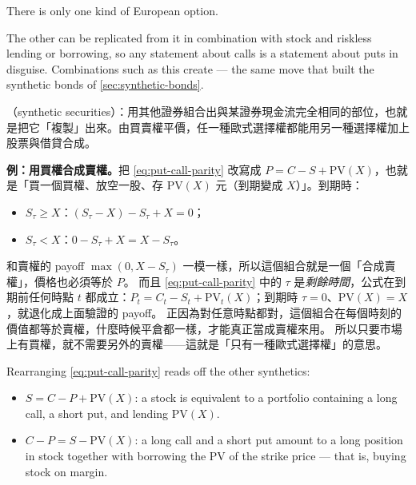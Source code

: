 
\begin{moral}
	There is only one kind of European option.

	The other can be replicated from it in combination with stock and riskless lending or borrowing, so any statement about calls is a statement about puts in disguise.
	Combinations such as this create  --- the same move that built the synthetic bonds of \autoref{sec:synthetic-bonds}.
\end{moral}

\suppstart
\begin{remark}
	（synthetic securities）：用其他證券組合出與某證券現金流完全相同的部位，也就是把它「複製」出來。由買賣權平價，任一種歐式選擇權都能用另一種選擇權加上股票與借貸合成。

	\textbf{例：用買權合成賣權。}把 \eqref{eq:put-call-parity} 改寫成 $P=C-S+\mathrm{PV}(X)$，也就是「買一個買權、放空一股、存 $\mathrm{PV}(X)$ 元（到期變成 $X$）」。到期時：
	\begin{itemize}[nosep]
		\item $S_{\tau}\ge X$：$(S_{\tau}-X)-S_{\tau}+X=0$；
		\item $S_{\tau}<X$：$0-S_{\tau}+X=X-S_{\tau}$。
	\end{itemize}
	和賣權的 payoff $\max(0,X-S_{\tau})$ 一模一樣，所以這個組合就是一個「合成賣權」，價格也必須等於 $P$。
	而且 \eqref{eq:put-call-parity} 中的 $\tau$ 是\emph{剩餘時間}，公式在到期前任何時點 $t$ 都成立：$P_{t}=C_{t}-S_{t}+\mathrm{PV}_{t}(X)$；到期時 $\tau=0$、$\mathrm{PV}(X)=X$，就退化成上面驗證的 payoff。
	正因為對任意時點都對，這個組合在每個時刻的價值都等於賣權，什麼時候平倉都一樣，才能真正當成賣權來用。
	所以只要市場上有買權，就不需要另外的賣權——這就是「只有一種歐式選擇權」的意思。
\end{remark}
\suppend

Rearranging \eqref{eq:put-call-parity} reads off the other synthetics:

\begin{itemize}[itemsep=0.3em]
	\item $S = C - P + \mathrm{PV}(X)$: a stock is equivalent to a portfolio containing a long call, a short put, and lending $\mathrm{PV}(X)$.
	\item $C - P = S - \mathrm{PV}(X)$: a long call and a short put amount to a long position in stock together with borrowing the PV of the strike price --- that is, buying stock on margin.
\end{itemize}

